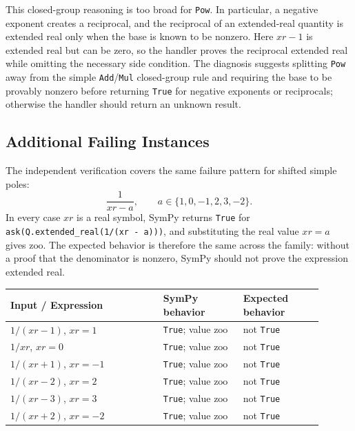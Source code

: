 \documentclass[11pt]{article}
\begin{document}
This closed-group reasoning is too broad for \texttt{Pow}.  In particular, a
negative exponent creates a reciprocal, and the reciprocal of an extended-real
quantity is extended real only when the base is known to be nonzero.  Here
\(xr-1\) is extended real but can be zero, so the handler proves the reciprocal
extended real while omitting the necessary side condition.  The diagnosis
suggests splitting \texttt{Pow} away from the simple \texttt{Add}/\texttt{Mul}
closed-group rule and requiring the base to be provably nonzero before returning
\texttt{True} for negative exponents or reciprocals; otherwise the handler should
return an unknown result.

\subsection{Additional Failing Instances}

The independent verification covers the same failure pattern for shifted simple
poles:
\[
  \frac{1}{xr-a}, \qquad a\in\{1,0,-1,2,3,-2\}.
\]
In every case \(xr\) is a real symbol, SymPy returns \texttt{True} for
\texttt{ask(Q.extended\_real(1/(xr - a)))}, and substituting the real value
\(xr=a\) gives \(\mathrm{zoo}\).  The expected behavior is therefore the same
across the family: without a proof that the denominator is nonzero, SymPy should
not prove the expression extended real.

\begin{center}
\renewcommand{\arraystretch}{1.3}
\begin{tabular}{@{}>{\raggedright\arraybackslash}p{0.44\linewidth}>{\raggedright\arraybackslash}p{0.23\linewidth}>{\raggedright\arraybackslash}p{0.23\linewidth}@{}}
\toprule
\textbf{Input / Expression} & \textbf{SymPy behavior} & \textbf{Expected behavior} \\
\midrule
\(1/(xr-1)\), \(xr=1\) & \texttt{True}; value \(\mathrm{zoo}\) & not \texttt{True} \\
\(1/xr\), \(xr=0\) & \texttt{True}; value \(\mathrm{zoo}\) & not \texttt{True} \\
\(1/(xr+1)\), \(xr=-1\) & \texttt{True}; value \(\mathrm{zoo}\) & not \texttt{True} \\
\(1/(xr-2)\), \(xr=2\) & \texttt{True}; value \(\mathrm{zoo}\) & not \texttt{True} \\
\(1/(xr-3)\), \(xr=3\) & \texttt{True}; value \(\mathrm{zoo}\) & not \texttt{True} \\
\(1/(xr+2)\), \(xr=-2\) & \texttt{True}; value \(\mathrm{zoo}\) & not \texttt{True} \\
\bottomrule
\end{tabular}
\end{center}
\end{document}
